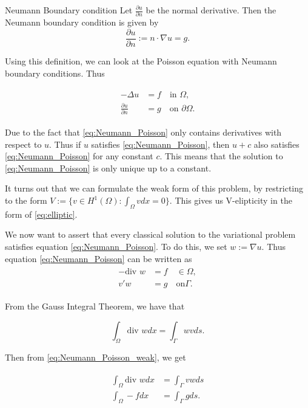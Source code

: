 

\begin{defn}{Neumann Boundary condition}
    Let $\frac{\partial u}{\partial n}$ be the normal derivative. Then the Neumann boundary condition is given by
    \begin{equation}
        \frac{\partial u}{\partial n} := n\cdot \nabla u = g.
    \end{equation}
\end{defn}

Using this definition, we can look at the Poisson equation with Neumann boundary conditions. Thus

\begin{align}
\label{eq:Neumann_Poisson}
\begin{split}
    -\Delta u &= f \quad \text{in } \Omega, \\
    \frac{\partial u}{\partial n} &= g \quad \text{on } \partial \Omega.
\end{split}
\end{align}

Due to the fact that \ref{eq:Neumann_Poisson} only contains derivatives with respect to $u$. 
Thus if $u$ satisfies \ref{eq:Neumann_Poisson}, then $u + c$ also satisfies \ref{eq:Neumann_Poisson} for any constant $c$.
This means that the solution to \ref{eq:Neumann_Poisson} is only unique up to a constant.

It turns out that we can formulate the weak form of this problem, by restricting to the form $V:=\{v\in H^1(\Omega):\int_{\Omega}vdx=0\}.$
This gives us V-elipticity in the form of \ref{eq:elliptic}. 

We now want to assert that every classical solution to the variational problem satisfies equation \ref{eq:Neumann_Poisson}.
To do this, we set $w:=\nabla u$. Thus equation \ref*{eq:Neumann_Poisson} can be written as
\begin{align}\label{eq:Neumann_Poisson_weak}
\begin{split}
    -\text{div } w &= f \quad \in \Omega, \\
    v'w &= g \quad \text{on} \Gamma.
\end{split}    
\end{align}

From the Gauss Integral Theorem, we have that

\[\int_{\Omega} \text{div } w dx = \int_{\Gamma} wv ds.\]

Then from \ref{eq:Neumann_Poisson_weak}, we get

\begin{align}
\begin{split}
\int_{\Omega} \text{div } w dx &= \int_{\Gamma} vw ds \\
\int_{\Omega} -f dx &= \int_{\Gamma} g ds.
\end{split}
\end{align}

